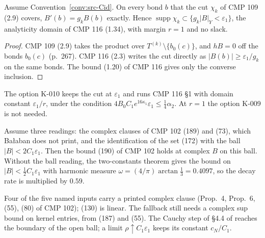 \begin{proposition}\label{prop:L031}
Assume Convention~\ref{conv:src-Cid}. On every bond $b$ that the cut $\chi_k$ of CMP 109 (2.9) covers, $B'(b)=g_kB(b)$ exactly. Hence $\operatorname{supp}\chi_k\subset\{g_k|B|_Y<\varepsilon_1\}$, the analyticity domain of CMP 116 (1.34), with margin $r=1$ and no slack.
\end{proposition}
\begin{proof}
CMP 109 (2.9) takes the product over $T^{(k)}\setminus\{b_0(c)\}$, and $hB=0$ off the bonds $b_0(c)$ (p.~267). CMP 116 (2.3) writes the cut directly as $|B(b)|\ge\varepsilon_1/g_k$ on the same bonds. The bound (1.20) of CMP 116 gives only the converse inclusion.
\end{proof}
The option K-010 keeps the cut at $\varepsilon_1$ and runs CMP 116 \S1 with domain constant $\varepsilon_1/r$, under the condition $4B_0C_1e^{16\kappa_1}\varepsilon_1\le\tfrac14\alpha_2$. At $r=1$ the option K-009 is not needed.

\begin{proposition}\label{prop:L032}
Assume three readings: the complex clauses of CMP 102 (189) and (73), which Ba{\l}aban does not print, and the identification of the set (172) with the ball $|B|<2C_1\varepsilon_1$. Then the bound (190) of CMP 102 holds at complex $B$ on this ball. Without the ball reading, the two-constants theorem gives the bound on $|B|<\tfrac12C_1\varepsilon_1$ with harmonic measure $\omega=(4/\pi)\arctan\tfrac13=0.4097$, so the decay rate is multiplied by $0.59$.
\end{proposition}
Four of the five named inputs carry a printed complex clause (Prop.\ 4, Prop.\ 6, (55), (80) of CMP 102); (130) is linear. The fallback still needs a complex sup bound on kernel entries, from (187) and (55). The Cauchy step of \S4.4 of  reaches the boundary of the open ball; a limit $\rho\uparrow C_1\varepsilon_1$ keeps its constant $c_N/C_1$.

